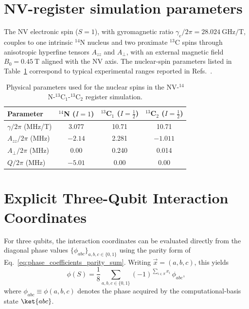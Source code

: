 \section{NV-register simulation parameters}
\label{app:nv_params}
\noindent
The NV electronic spin ($S{=}1$), with gyromagnetic ratio 
$\gamma_e/2\pi = 28.024~\text{GHz/T}$, couples to one intrinsic 
$^{14}$N nucleus and two proximate $^{13}$C spins through anisotropic 
hyperfine tensors $A_{zz}$ and $A_{\perp}$, with an external magnetic 
field $B_0 = 0.45~\text{T}$ aligned with the NV axis. 
The nuclear-spin parameters listed in Table~\ref{tab:nv_params_table} 
correspond to typical experimental ranges reported in 
Refs.~\cite{Chen,nizovtsev}.\\
\begin{table}[t]
\centering
\caption{Physical parameters used for the nuclear spins in the 
NV-$^{14}$N-$^{13}$C$_1$-$^{13}$C$_2$ register simulation.}
\label{tab:nv_params_table}
\begin{tabular}{lccc}
\toprule
Parameter & $^{14}$N ($I{=}1$) & $^{13}$C$_1$ ($I{=}\tfrac{1}{2}$) & $^{13}$C$_2$ ($I{=}\tfrac{1}{2}$) \\
\midrule
$\gamma/2\pi$ (MHz/T) & 3.077 & 10.71 & 10.71 \\
$A_{zz}/2\pi$ (MHz)                     & $-2.14$ & 2.281 & $-1.011$ \\
$A_{\perp}/2\pi$ (MHz)                  & 0.00 & 0.240 & 0.014 \\
$Q/2\pi$ (MHz)                          & $-5.01$ & 0.00 & 0.00 \\
\bottomrule
\end{tabular}
\end{table}


\section{Explicit Three-Qubit Interaction Coordinates}
\label{app:explicit_3q_invariants}

\noindent
For three qubits, the interaction coordinates can be evaluated directly from the diagonal phase values $\{\phi_{abc}\}_{a,b,c\in\{0,1\}}$ using the parity form of Eq.~\eqref{eq:phase_coefficients_parity_sum}. Writing $\vec{x}=(a,b,c)$, this yields
\begin{equation}
\label{eq:phiS_3q_general}
\phi(S)
=
\frac{1}{8}
\sum_{a,b,c\in\{0,1\}}
(-1)^{\sum_{i\in S} x_i}\,\phi_{abc},
\end{equation}
where $\phi_{abc} \equiv \phi(a,b,c)$ denotes the phase acquired by the computational-basis state $\ket{abc}$.

